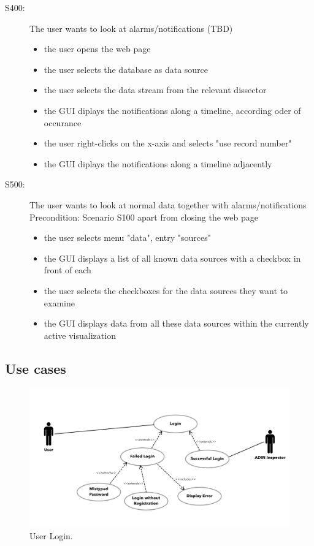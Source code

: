 \documentclass[twoside, english, final]{Pflichtenheft}
\begin{document}
\begin{description}
	\item[S400:] The user wants to look at alarms/notifications (TBD)
	      \begin{itemize}
		      \item{the user opens the web page}
		      \item{the user selects the database as data source}
		      \item{the user selects the data stream from the relevant dissector}
		      \item{the GUI diplays the notifications along a timeline, according oder of occurance}
		      \item{the user right-clicks on the x-axis and selects "use record number"}
		      \item{the GUI diplays the notifications along a timeline adjacently}
	      \end{itemize}



	\item[S500:] The user wants to look at normal data together with alarms/notifications
	      \\
	      Precondition: Scenario S100 apart from closing the web page
	      \begin{itemize}
		      \item{the user selects menu "data", entry "sources"}
		      \item{the GUI displays a list of all known data sources with a checkbox in front of each}
		      \item{the user selects the checkboxes for the data sources they want to examine}
		      \item{the GUI displays data from all these data sources within the currently active visualization}
	      \end{itemize}


\end{description}

\subsection{Use cases}
\begin{figure}[h]
	\centering
	\includegraphics[width=\textwidth]{Images/case_login.PNG}
	\caption{User Login.}
\end{figure}
\end{document}

